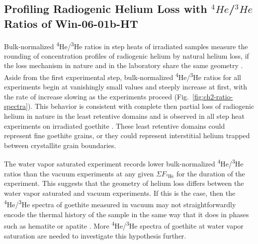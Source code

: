 \subsection{Profiling Radiogenic Helium Loss with $^4He$/$^3He$ Ratios of Win-06-01b-HT}\label{spectra-of-win-06-01b-ht}

Bulk-normalized \textsuperscript{4}He/\textsuperscript{3}He ratios in step heats of irradiated samples
measure the rounding of concentration profiles of radiogenic helium by natural helium loss, if the
loss mechanism in nature and in the laboratory share the same geometry
\citep{shusterfarley2004,farley2024}. Aside from the first
experimental step, bulk-normalized \textsuperscript{4}He/\textsuperscript{3}He ratios for all experiments begin
at vanishingly small values and steeply increase at first, with the rate
of increase slowing as the experiments proceed (Fig.~\ref{fig:ch2-ratio-spectra}). This
behavior is consistent with complete then partial loss of radiogenic
helium in nature in the least retentive domains and is observed in all
step heat experiments on irradiated goethite \citep{shustervasconcelos2005,vasconcelos2013,farley2024}. 
These least retentive domains could represent fine goethite grains, or they could represent 
interstitial helium trapped between crystallite grain boundaries.

The water vapor saturated experiment records lower bulk-normalized \textsuperscript{4}He/\textsuperscript{3}He
ratios than the vacuum experiments at any given $\Sigma F_{^{3}\mathrm{He}}$ for the duration
of the experiment. This suggests that the geometry of helium loss
differs between the water vapor saturated and vacuum experiments. 
If this is the case, then the \textsuperscript{4}He/\textsuperscript{3}He spectra of goethite measured in vacuum may not
straightforwardly encode the thermal history of the sample in the same way that it does
in phases such as hematite or apatite \citep{farleymckeon2015,shusterfarley2004}. 
More \textsuperscript{4}He/\textsuperscript{3}He spectra of goethite at water vapor saturation are needed to 
investigate this hypothesis further. 

